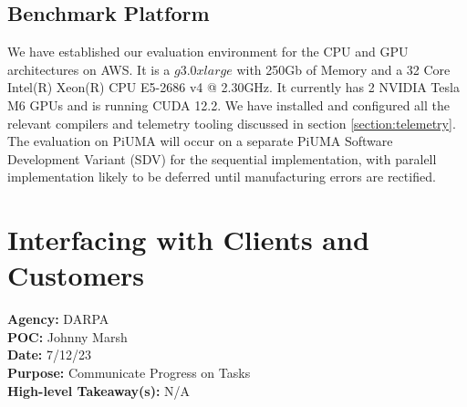 \documentclass[letterpaper, 10pt]{article}
\begin{document}
\begin{multicols}{2}
{    \subsection{Benchmark Platform}
        \par{We have established our evaluation environment for the CPU and GPU architectures on AWS. It is a $g3.0xlarge$ with 250Gb of Memory and a 32 Core Intel(R) Xeon(R) CPU E5-2686 v4 @ 2.30GHz. 
        It currently has 2 NVIDIA Tesla M6 GPUs and is running CUDA 12.2. 
        We have installed and configured all the relevant compilers and telemetry tooling discussed in section \ref{section:telemetry}.
        The evaluation on PiUMA will occur on a separate PiUMA Software Development Variant (SDV) for the sequential implementation, with paralell implementation likely to be deferred until manufacturing errors are rectified.}
       
    \section{Interfacing with Clients and Customers}\label{section:stakeholders}  
        \textbf{Agency:} DARPA\\  
        \textbf{POC:} Johnny Marsh \\
        \textbf{Date:} 7/12/23 \\
        \textbf{Purpose:} Communicate Progress on Tasks \\
        \textbf{High-level Takeaway(s):} N/A \\ 

}
\end{multicols}
\end{document}
